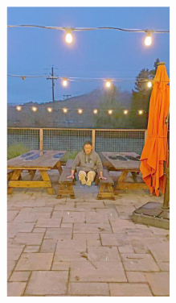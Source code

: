 \documentclass[letterpaper,12pt]{article}
\begin{document}
\begin{figure}[htbp]
\begin{subfigure}{0.128\textwidth}
			\includegraphics[width=\linewidth]{LoLi-Phone-imgT_1/Zero-DCE}
			\captionsetup{font=scriptsize}
			\caption{}
			\label{fig: LoLi-Phone-imgT_1_m}  
		\end{subfigure}
		\begin{subfigure}{0.128\textwidth}

\end{subfigure}
\end{figure}
\end{document}
